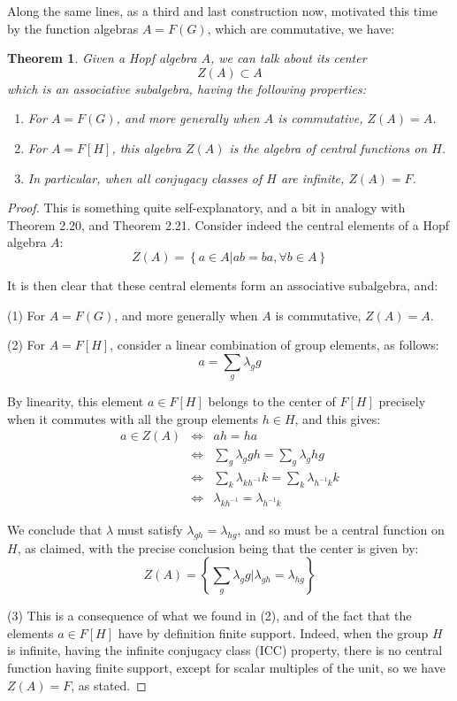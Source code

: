 \documentclass[12pt]{amsbook}
\newtheorem{theorem}{Theorem}[chapter]
\begin{document}
\bigskip

Along the same lines, as a third and last construction now, motivated this time by the function algebras $A=F(G)$, which are commutative, we have:


\begin{theorem}
Given a Hopf algebra $A$, we can talk about its center
$$Z(A)\subset A$$
which is an associative subalgebra, having the following properties:
\begin{enumerate}
\item For $A=F(G)$, and more generally when $A$ is commutative, $Z(A)=A$.

\item For $A=F[H]$, this algebra $Z(A)$ is the algebra of central functions on $H$.

\item In particular, when all conjugacy classes of $H$ are infinite, $Z(A)=F$.
\end{enumerate}
\end{theorem}

\begin{proof}
This is something quite self-explanatory, and a bit in analogy with Theorem 2.20, and Theorem 2.21. Consider indeed the central elements of a Hopf algebra $A$:
$$Z(A)=\left\{a\in A\Big|ab=ba,\forall b\in A\right\}$$

It is then clear that these central elements form an associative subalgebra, and:

\medskip

(1) For $A=F(G)$, and more generally when $A$ is commutative, $Z(A)=A$.

\medskip

(2) For $A=F[H]$, consider a linear combination of group elements, as follows:
$$a=\sum_g\lambda_gg$$

By linearity, this element $a\in F[H]$ belongs to the center of $F[H]$ precisely when it commutes with all the group elements $h\in H$, and this gives:
\begin{eqnarray*}
a\in Z(A)
&\iff&ah=ha\\
&\iff&\sum_g\lambda_ggh=\sum_g\lambda_ghg\\
&\iff&\sum_k\lambda_{kh^{-1}}k=\sum_k\lambda_{h^{-1}k}k\\
&\iff&\lambda_{kh^{-1}}=\lambda_{h^{-1}k}
\end{eqnarray*}

We conclude that $\lambda$ must satisfy $\lambda_{gh}=\lambda_{hg}$, and so must be a central function on $H$, as claimed, with the precise conclusion being that the center is given by:
$$Z(A)=\left\{\sum_g\lambda_gg\Big|\lambda_{gh}=\lambda_{hg}\right\}$$

(3) This is a consequence of what we found in (2), and of the fact that the elements $a\in F[H]$ have by definition finite support. Indeed, when the group $H$ is infinite, having the infinite conjugacy class (ICC) property, there is no central function having finite support, except for scalar multiples of the unit, so we have $Z(A)=F$, as stated.
\end{proof}
\end{document}
